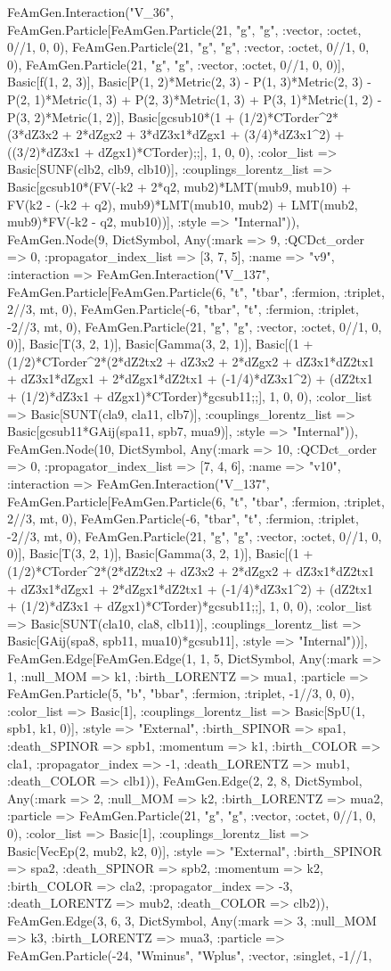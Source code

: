 \documentclass{revtex4}
\begin{document}
\begin{figure}[!htb]
\begin{center}
{FeAmGen.Interaction("V_36", FeAmGen.Particle[FeAmGen.Particle(21, "g", "g", :vector, :octet, 0//1, 0, 0), FeAmGen.Particle(21, "g", "g", :vector, :octet, 0//1, 0, 0), FeAmGen.Particle(21, "g", "g", :vector, :octet, 0//1, 0, 0)], Basic[f(1, 2, 3)], Basic[P(1, 2)*Metric(2, 3) - P(1, 3)*Metric(2, 3) - P(2, 1)*Metric(1, 3) + P(2, 3)*Metric(1, 3) + P(3, 1)*Metric(1, 2) - P(3, 2)*Metric(1, 2)], Basic[gcsub10*(1 + (1/2)*CTorder^2*(3*dZ3x2 + 2*dZgx2 + 3*dZ3x1*dZgx1 + (3/4)*dZ3x1^2) + ((3/2)*dZ3x1 + dZgx1)*CTorder);;], 1, 0, 0), :color_list => Basic[SUNF(clb2, clb9, clb10)], :couplings_lorentz_list => Basic[gcsub10*(FV(-k2 + 2*q2, mub2)*LMT(mub9, mub10) + FV(k2 - (-k2 + q2), mub9)*LMT(mub10, mub2) + LMT(mub2, mub9)*FV(-k2 - q2, mub10))], :style => "Internal")), FeAmGen.Node(9, Dict{Symbol, Any}(:mark => 9, :QCDct_order => 0, :propagator_index_list => [3, 7, 5], :name => "v9", :interaction => FeAmGen.Interaction("V_137", FeAmGen.Particle[FeAmGen.Particle(6, "t", "tbar", :fermion, :triplet, 2//3, mt, 0), FeAmGen.Particle(-6, "tbar", "t", :fermion, :triplet, -2//3, mt, 0), FeAmGen.Particle(21, "g", "g", :vector, :octet, 0//1, 0, 0)], Basic[T(3, 2, 1)], Basic[Gamma(3, 2, 1)], Basic[(1 + (1/2)*CTorder^2*(2*dZ2tx2 + dZ3x2 + 2*dZgx2 + dZ3x1*dZ2tx1 + dZ3x1*dZgx1 + 2*dZgx1*dZ2tx1 + (-1/4)*dZ3x1^2) + (dZ2tx1 + (1/2)*dZ3x1 + dZgx1)*CTorder)*gcsub11;;], 1, 0, 0), :color_list => Basic[SUNT(cla9, cla11, clb7)], :couplings_lorentz_list => Basic[gcsub11*GAij(spa11, spb7, mua9)], :style => "Internal")), FeAmGen.Node(10, Dict{Symbol, Any}(:mark => 10, :QCDct_order => 0, :propagator_index_list => [7, 4, 6], :name => "v10", :interaction => FeAmGen.Interaction("V_137", FeAmGen.Particle[FeAmGen.Particle(6, "t", "tbar", :fermion, :triplet, 2//3, mt, 0), FeAmGen.Particle(-6, "tbar", "t", :fermion, :triplet, -2//3, mt, 0), FeAmGen.Particle(21, "g", "g", :vector, :octet, 0//1, 0, 0)], Basic[T(3, 2, 1)], Basic[Gamma(3, 2, 1)], Basic[(1 + (1/2)*CTorder^2*(2*dZ2tx2 + dZ3x2 + 2*dZgx2 + dZ3x1*dZ2tx1 + dZ3x1*dZgx1 + 2*dZgx1*dZ2tx1 + (-1/4)*dZ3x1^2) + (dZ2tx1 + (1/2)*dZ3x1 + dZgx1)*CTorder)*gcsub11;;], 1, 0, 0), :color_list => Basic[SUNT(cla10, cla8, clb11)], :couplings_lorentz_list => Basic[GAij(spa8, spb11, mua10)*gcsub11], :style => "Internal"))], FeAmGen.Edge[FeAmGen.Edge(1, 1, 5, Dict{Symbol, Any}(:mark => 1, :null_MOM => k1, :birth_LORENTZ => mua1, :particle => FeAmGen.Particle(5, "b", "bbar", :fermion, :triplet, -1//3, 0, 0), :color_list => Basic[1], :couplings_lorentz_list => Basic[SpU(1, spb1, k1, 0)], :style => "External", :birth_SPINOR => spa1, :death_SPINOR => spb1, :momentum => k1, :birth_COLOR => cla1, :propagator_index => -1, :death_LORENTZ => mub1, :death_COLOR => clb1)), FeAmGen.Edge(2, 2, 8, Dict{Symbol, Any}(:mark => 2, :null_MOM => k2, :birth_LORENTZ => mua2, :particle => FeAmGen.Particle(21, "g", "g", :vector, :octet, 0//1, 0, 0), :color_list => Basic[1], :couplings_lorentz_list => Basic[VecEp(2, mub2, k2, 0)], :style => "External", :birth_SPINOR => spa2, :death_SPINOR => spb2, :momentum => k2, :birth_COLOR => cla2, :propagator_index => -3, :death_LORENTZ => mub2, :death_COLOR => clb2)), FeAmGen.Edge(3, 6, 3, Dict{Symbol, Any}(:mark => 3, :null_MOM => k3, :birth_LORENTZ => mua3, :particle => FeAmGen.Particle(-24, "Wminus", "Wplus", :vector, :singlet, -1//1, }
\end{center}
\end{figure}
\end{document}
